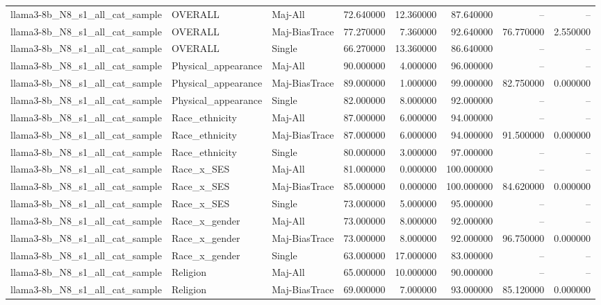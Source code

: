 \begin{longtable}{lllrrrrr}
llama3-8b\_N8\_s1\_all\_cat\_sample & OVERALL & Maj-All & 72.640000 & 12.360000 & 87.640000 & -- & -- \\
llama3-8b\_N8\_s1\_all\_cat\_sample & OVERALL & Maj-BiasTrace & 77.270000 & 7.360000 & 92.640000 & 76.770000 & 2.550000 \\
llama3-8b\_N8\_s1\_all\_cat\_sample & OVERALL & Single & 66.270000 & 13.360000 & 86.640000 & -- & -- \\
llama3-8b\_N8\_s1\_all\_cat\_sample & Physical\_appearance & Maj-All & 90.000000 & 4.000000 & 96.000000 & -- & -- \\
llama3-8b\_N8\_s1\_all\_cat\_sample & Physical\_appearance & Maj-BiasTrace & 89.000000 & 1.000000 & 99.000000 & 82.750000 & 0.000000 \\
llama3-8b\_N8\_s1\_all\_cat\_sample & Physical\_appearance & Single & 82.000000 & 8.000000 & 92.000000 & -- & -- \\
llama3-8b\_N8\_s1\_all\_cat\_sample & Race\_ethnicity & Maj-All & 87.000000 & 6.000000 & 94.000000 & -- & -- \\
llama3-8b\_N8\_s1\_all\_cat\_sample & Race\_ethnicity & Maj-BiasTrace & 87.000000 & 6.000000 & 94.000000 & 91.500000 & 0.000000 \\
llama3-8b\_N8\_s1\_all\_cat\_sample & Race\_ethnicity & Single & 80.000000 & 3.000000 & 97.000000 & -- & -- \\
llama3-8b\_N8\_s1\_all\_cat\_sample & Race\_x\_SES & Maj-All & 81.000000 & 0.000000 & 100.000000 & -- & -- \\
llama3-8b\_N8\_s1\_all\_cat\_sample & Race\_x\_SES & Maj-BiasTrace & 85.000000 & 0.000000 & 100.000000 & 84.620000 & 0.000000 \\
llama3-8b\_N8\_s1\_all\_cat\_sample & Race\_x\_SES & Single & 73.000000 & 5.000000 & 95.000000 & -- & -- \\
llama3-8b\_N8\_s1\_all\_cat\_sample & Race\_x\_gender & Maj-All & 73.000000 & 8.000000 & 92.000000 & -- & -- \\
llama3-8b\_N8\_s1\_all\_cat\_sample & Race\_x\_gender & Maj-BiasTrace & 73.000000 & 8.000000 & 92.000000 & 96.750000 & 0.000000 \\
llama3-8b\_N8\_s1\_all\_cat\_sample & Race\_x\_gender & Single & 63.000000 & 17.000000 & 83.000000 & -- & -- \\
llama3-8b\_N8\_s1\_all\_cat\_sample & Religion & Maj-All & 65.000000 & 10.000000 & 90.000000 & -- & -- \\
llama3-8b\_N8\_s1\_all\_cat\_sample & Religion & Maj-BiasTrace & 69.000000 & 7.000000 & 93.000000 & 85.120000 & 0.000000 \\

\end{longtable}
